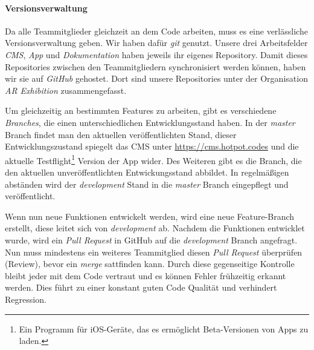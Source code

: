 \documentclass[titlepage, a4paper, 11pt]{scrartcl}
\begin{document}
      \paragraph{Versionsverwaltung}
        Da alle Teammitglieder gleichzeit an dem Code arbeiten, muss es eine verlässliche Versionsverwaltung geben.
        Wir haben dafür \textit{git} genutzt. Unsere drei Arbeitsfelder \textit{CMS}, \textit{App} und \textit{Dokumentation} haben jeweils ihr eigenes Repository.
        Damit dieses Repositories zwischen den Teammitgliedern synchronisiert werden können, haben wir sie auf \textit{GitHub} gehostet.
        Dort sind unsere Repositories unter der Organisation \textit{AR Exhibition} zusammengefasst.

        Um gleichzeitig an bestimmten Features zu arbeiten, gibt es verschiedene \textit{Branches}, die einen unterschiedlichen Entwicklungsstand haben.
        In der \textit{master} Branch findet man den aktuellen veröffentlichten Stand, dieser Entwicklungszustand spiegelt das CMS unter \url{https://cms.hotpot.codes}
        und die aktuelle Testflight\footnote{Ein Programm für iOS-Geräte, das es ermöglicht Beta-Versionen von Apps zu laden.} Version der App wider.
        Des Weiteren gibt es die  Branch, die den aktuellen unveröffentlichten Entwickungsstand abbildet.
        In regelmäßigen abständen wird der \textit{development} Stand in die \textit{master} Branch eingepflegt und veröffentlicht.

        Wenn nun neue Funktionen entwickelt werden, wird eine neue Feature-Branch erstellt, diese leitet sich von \textit{development} ab.
        Nachdem die Funktionen entwicklet wurde, wird ein \textit{Pull Request} in GitHub auf die \textit{development} Branch angefragt.
        Nun muss mindestens ein weiteres Teammitglied diesen \textit{Pull Request} überprüfen (Review), bevor ein \textit{merge} sattfinden kann.
        Durch diese gegenseitige Kontrolle bleibt jeder mit dem Code vertraut und es können Fehler frühzeitig erkannt werden.
        Dies führt zu einer konstant guten Code Qualität und verhindert Regression.
\end{document}

